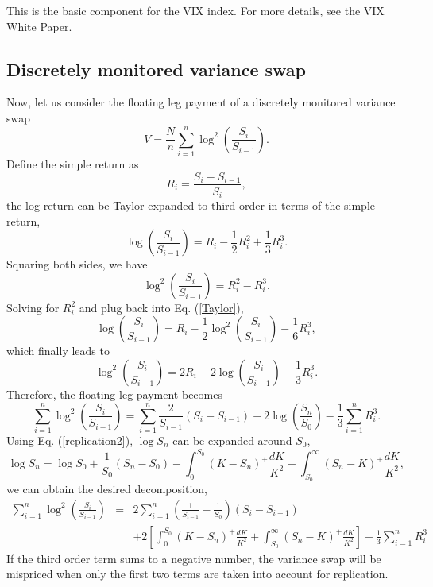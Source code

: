 \documentclass[12pt]{article}
\begin{document}
    This is the basic component for the VIX index. For more details, see the VIX White Paper. \cite{VIX}

  \subsection{Discretely monitored variance swap}

    Now, let us consider the floating leg payment of a discretely monitored variance swap \cite{CarrLee}
    \begin{equation}
      V = \frac{N}{n}\sum_{i=1}^n\log^2\left(\frac{S_i}{S_{i-1}}\right).
    \end{equation}
    Define the simple return as
    \begin{equation}
      R_i=\frac{S_i-S_{i-1}}{S_i},
    \end{equation}
    the log return can be Taylor expanded to third order in terms of the simple return,
    \begin{equation}
      \log\left(\frac{S_i}{S_{i-1}}\right)=R_i-\frac{1}{2}R_i^2+\frac{1}{3}R_i^3.
      \label{Taylor}
    \end{equation}
    Squaring both sides, we have
    \begin{equation}
      \log^2\left(\frac{S_i}{S_{i-1}}\right)=R_i^2-R_i^3.
    \end{equation}
    Solving for $R_i^2$ and plug back into Eq. (\ref{Taylor}),
    \begin{equation}
      \log\left(\frac{S_i}{S_{i-1}}\right)=R_i-\frac{1}{2}\log^2\left(\frac{S_i}{S_{i-1}}\right)-\frac{1}{6}R_i^3,
    \end{equation}
    which finally leads to
    \begin{equation}
      \log^2\left(\frac{S_i}{S_{i-1}}\right)=2R_i-2\log\left(\frac{S_i}{S_{i-1}}\right)-\frac{1}{3}R_i^3.
    \end{equation}
    Therefore, the floating leg payment becomes
    \begin{equation}
      \sum_{i=1}^n\log^2\left(\frac{S_i}{S_{i-1}}\right)=\sum_{i=1}^n\frac{2}{S_{i-1}}(S_i-S_{i-1})-2\log\left(\frac{S_n}{S_0}\right)-\frac{1}{3}\sum_{i=1}^nR_i^3.
    \end{equation}
    Using Eq. (\ref{replication2}), $\log S_n$ can be expanded around $S_0$,
    \begin{equation}
      \log S_n = \log S_0 +\frac{1}{S_0}\left(S_n-S_0\right)-\int_0^{S_0}\left(K-S_n\right)^+\frac{dK}{K^2}-\int_{S_0}^{\infty}\left(S_n-K\right)^+\frac{dK}{K^2},
    \end{equation}
    we can obtain the desired decomposition,
    \begin{eqnarray}
      \sum_{i=1}^n\log^2\left(\frac{S_i}{S_{i-1}}\right)&=&2\sum_{i=1}^n\left(\frac{1}{S_{i-1}}-\frac{1}{S_0}\right)(S_i-S_{i-1})\nonumber\\
          && + 2\left[\int_0^{S_0}\left(K-S_n\right)^+\frac{dK}{K^2}+\int_{S_0}^{\infty}\left(S_n-K\right)^+\frac{dK}{K^2}\right]-\frac{1}{3}\sum_{i=1}^nR_i^3
    \end{eqnarray}
    If the third order term sums to a negative number, the variance swap will be mispriced when only the first two terms are
    taken into account for replication.
\end{document}
